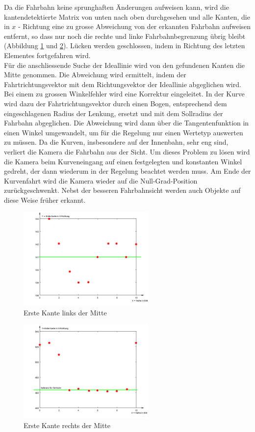 Da die Fahrbahn keine sprunghaften Änderungen aufweisen kann, wird die kantendetektierte Matrix von unten nach oben durchgesehen und alle Kanten, die in $x$ - Richtung eine zu grosse Abweichung von der erkannten Fahrbahn aufweisen entfernt, so dass nur noch die rechte und linke Fahrbahnbegrenzung übrig bleibt (Abbildung \ref{fig:kantenl} und \ref{fig:kantenr}). Lücken werden geschlossen, indem in Richtung des letzten Elementes fortgefahren wird.\\
Für die anschliessende Suche der Ideallinie wird von den gefundenen Kanten die Mitte genommen. Die Abweichung wird ermittelt, indem der Fahrtrichtungsvektor mit dem Richtungsvektor der Ideallinie abgeglichen wird. Bei einem zu grossen Winkelfehler wird eine Korrektur eingeleitet. In der Kurve wird dazu der Fahrtrichtungsvektor durch einen Bogen, entsprechend dem eingeschlagenen Radius der Lenkung, ersetzt und mit dem Sollradius der Fahrbahn abgeglichen. Die Abweichung wird dann über die Tangentenfunktion in einen Winkel umgewandelt, um für die Regelung nur einen Wertetyp auswerten zu müssen. Da die Kurven, insbesondere auf der Innenbahn, sehr eng sind, verliert die Kamera die Fahrbahn aus der Sicht. Um dieses Problem zu lösen wird die Kamera beim Kurveneingang auf einen festgelegten und konstanten Winkel gedreht, der dann wiederum in der Regelung beachtet werden muss. Am Ende der Kurvenfahrt wird die Kamera wieder auf die Null-Grad-Position zurückgeschwenkt. Nebst der besseren Fahrbahnsicht werden auch Objekte auf diese Weise früher erkannt.
\begin{figure}[H]
\centering
\includegraphics[width=0.6\textwidth]{03_Loesungskonzept/pictures/minEdge.png}
\caption{Erste Kante links der Mitte}
\label{fig:kantenl}
\end{figure}
\begin{figure}[H]
\centering
\includegraphics[width=0.6\textwidth]{03_Loesungskonzept/pictures/maxEdge.png}
\caption{Erste Kante rechts der Mitte}
\label{fig:kantenr}
\end{figure}
